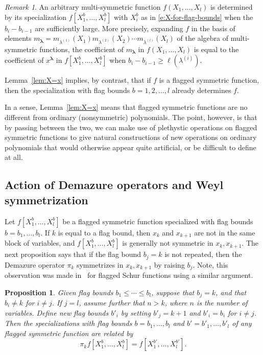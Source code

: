 \documentclass[12pt]{amsart}
\newtheorem{prop}[thm]{Proposition}
\theoremstyle{definition}
\theoremstyle{remark}
\newtheorem{remark}[thm]{Remark}
\newcommand{\lambold}{{\boldsymbol \lambda }}
\newcommand{\Dem}{\pi }
\begin{document}
\begin{remark}\label{rem:big enough bounds}
An arbitrary multi-symmetric function $f(X_1,\dots, X_l)$ is
determined by its specialization $f[X^b_1,\dots, X^b_l]$ with $X^b_i$
as in \eqref{e:X-for-flag-bounds} when the $b_i-b_{i-1}$ are
sufficiently large.  More precisely, expanding $f$ in the basis of
elements $m_{\lambold } = m_{\lambda^{(1)}}(X_1)
m_{\lambda^{(2)}}(X_2) \cdots m_{\lambda^{(l)}}(X_l)$ of the algebra
of multi-symmetric functions, the coefficient of $m_{\lambold}$ in
$f(X_1, \dots, X_l)$ is equal to the coefficient of $x^{\lambold}$ in
$f[X^{b}_{1}, \ldots, X^{b}_{l}]$ when $b_i - b_{i-1}\ge
\ell(\lambda^{(i)})$.

Lemma~\ref{lem:X=x} implies, by contrast, that if $f$ is a flagged
symmetric function, then the specialization with flag bounds $b =
1,2,\dots, l$ already determines $f$.
\end{remark}


In a sense, Lemma~\ref{lem:X=x} means that flagged symmetric functions
are no different from ordinary (nonsymmetric) polynomials.  The point,
however, is that by passing between the two, we can make use of
plethystic operations on flagged symmetric functions to
give natural constructions of new operations on
ordinary polynomials that would otherwise appear quite
artificial, or be difficult to define at all.




\subsection{Action of Demazure operators and Weyl symmetrization}

Let $f[X^b_{1},\ldots,X^b_{l}]$ be a flagged symmetric function
specialized with flag bounds $b = b_{1},\ldots,b_{l}$.  If $k$ is
equal to a flag bound, then $x_{k}$ and $x_{k+1}$ are not in the same
block of variables, and $f[X^b_{1},\ldots,X^b_{l}]$ is generally not
symmetric in $x_{k}, x_{k+1}$.  The next proposition says that if the
flag bound $b_{j} = k$ is not repeated, then the Demazure operator
$\Dem _{k}$ symmetrizes in $x_{k}, x_{k+1}$ by raising $b_{j}$.  Note,
this observation was made in~\cite[eq.~(3.10)]{Macdonald91} for
flagged Schur functions using a similar argument.


\begin{prop}\label{prop:demazure-on-flagged}
Given flag bounds $b_{1}\leq \cdots \leq b_{l}$, suppose that $b_{j} =
k$, and that $b_{i}\not =k$ for $i\not =j$.  If $j=l$, assume further
that $n>k$, where $n$ is the number of variables.  Define new flag
bounds $b'_{i}$ by setting $b'_{j}=k+1$ and $b'_{i} = b_{i}$ for
$i\not =j$.  Then the specializations with flag bounds
$b = b_{1},\ldots,b_{l}$ and $b' = b'_{1},\ldots,b'_{l}$ of any flagged
symmetric function are related by
\begin{equation}\label{e:demazure-on-flagged}
\Dem _{k} f[X^b_{1},\ldots,X^b_{l}] = f[X^{b'}_{1},\ldots,X^{b'}_{l}].
\end{equation}
\end{prop}
\end{document}
